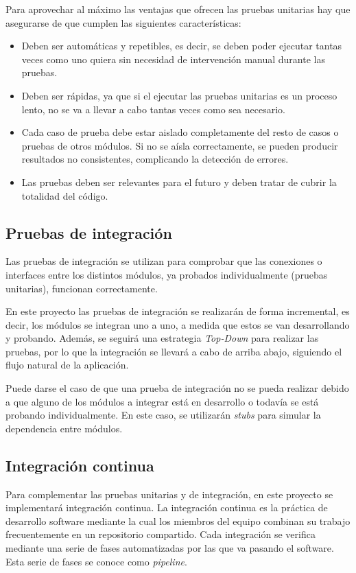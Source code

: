 Para aprovechar al máximo las ventajas que ofrecen las pruebas unitarias hay que asegurarse de que cumplen las siguientes características:
\begin{itemize}
    \item Deben ser automáticas y repetibles, es decir, se deben poder ejecutar tantas veces como uno quiera sin necesidad de intervención manual durante las pruebas.
    \item Deben ser rápidas, ya que si el ejecutar las pruebas unitarias es un proceso lento, no se va a llevar a cabo tantas veces como sea necesario.
    \item Cada caso de prueba debe estar aislado completamente del resto de casos o pruebas de otros módulos. Si no se aísla correctamente, se pueden producir resultados no consistentes, complicando la detección de errores.
    \item Las pruebas deben ser relevantes para el futuro y deben tratar de cubrir la totalidad del código.
\end{itemize}

\subsection{Pruebas de integración}
Las pruebas de integración se utilizan para comprobar que las conexiones o interfaces entre los distintos módulos, ya probados individualmente (pruebas unitarias), funcionan correctamente.

En este proyecto las pruebas de integración se realizarán de forma incremental, es decir, los módulos se integran uno a uno, a medida que estos se van desarrollando y probando. Además, se seguirá una estrategia \textit{Top-Down} para realizar las pruebas, por lo que la integración se llevará a cabo de arriba abajo, siguiendo el flujo natural de la aplicación. 

Puede darse el caso de que una prueba de integración no se pueda realizar debido a que alguno de los módulos a integrar está en desarrollo o todavía se está probando individualmente. En este caso, se utilizarán \textit{stubs} para simular la dependencia entre módulos.

\subsection{Integración continua}
Para complementar las pruebas unitarias y de integración, en este proyecto se implementará integración continua. La integración continua es la práctica de desarrollo software mediante la cual los miembros del equipo combinan su trabajo frecuentemente en un repositorio compartido. Cada integración se verifica mediante una serie de fases automatizadas por las que va pasando el software. Esta serie de fases se conoce como \textit{pipeline}.

